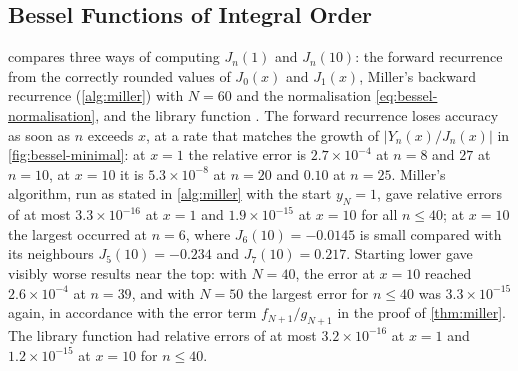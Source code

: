 \subsection{Bessel Functions of Integral Order}

 compares three ways of computing $J_n(1)$ and $J_n(10)$: the forward recurrence from the correctly rounded values of $J_0(x)$ and $J_1(x)$, Miller's backward recurrence (\cref{alg:miller}) with $N=60$ and the normalisation \eqref{eq:bessel-normalisation}, and the library function . The forward recurrence loses accuracy as soon as $n$ exceeds $x$, at a rate that matches the growth of $|Y_n(x)/J_n(x)|$ in \cref{fig:bessel-minimal}: at $x=1$ the relative error is $2.7\times10^{-4}$ at $n=8$ and $27$ at $n=10$, at $x=10$ it is $5.3\times10^{-8}$ at $n=20$ and $0.10$ at $n=25$. Miller's algorithm, run as stated in \cref{alg:miller} with the start $y_N=1$, gave relative errors of at most $3.3\times10^{-16}$ at $x=1$ and $1.9\times10^{-15}$ at $x=10$ for all $n\le40$; at $x=10$ the largest occurred at $n=6$, where $J_6(10)=-0.0145$ is small compared with its neighbours $J_5(10)=-0.234$ and $J_7(10)=0.217$. Starting lower gave visibly worse results near the top: with $N=40$, the error at $x=10$ reached $2.6\times10^{-4}$ at $n=39$, and with $N=50$ the largest error for $n\le40$ was $3.3\times10^{-15}$ again, in accordance with the error term $f_{N+1}/g_{N+1}$ in the proof of \cref{thm:miller}. The library function had relative errors of at most $3.2\times10^{-16}$ at $x=1$ and $1.2\times10^{-15}$ at $x=10$ for $n\le40$.

